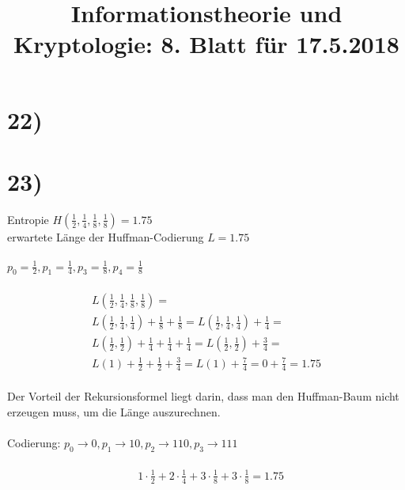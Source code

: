 %



  \title{Informationstheorie und Kryptologie: 8. Blatt für 17.5.2018}
  \maketitle

  \section*{22)}

  

  \section*{23)}

  Entropie $H(\frac{1}{2}, \frac{1}{4}, \frac{1}{8}, \frac{1}{8}) = 1.75$\\
  erwartete Länge der Huffman-Codierung $L = 1.75$\\
  \\
  $p_0 = \frac{1}{2}, p_1 = \frac{1}{4}, p_3 = \frac{1}{8}, p_4 = \frac{1}{8}$\\
  \\
  \begin{align*}
    & L(\frac{1}{2}, \frac{1}{4}, \frac{1}{8}, \frac{1}{8}) = &\\
    & L(\frac{1}{2}, \frac{1}{4}, \frac{1}{4}) + \frac{1}{8} + \frac{1}{8} = L(\frac{1}{2}, \frac{1}{4}, \frac{1}{4}) + \frac{1}{4} =\\
    & L(\frac{1}{2}, \frac{1}{2}) + \frac{1}{4} + \frac{1}{4} + \frac{1}{4} = L(\frac{1}{2}, \frac{1}{2}) + \frac{3}{4} =\\
    & L(1) + \frac{1}{2} + \frac{1}{2} + \frac{3}{4} = L(1) + \frac{7}{4} = 0 + \frac{7}{4} = 1.75
  \end{align*}
  \\
  Der Vorteil der Rekursionsformel liegt darin, dass man den Huffman-Baum nicht erzeugen muss, um die Länge auszurechnen.\\
  \\
  Codierung: $p_0 \rightarrow 0, p_1 \rightarrow 10, p_2 \rightarrow 110, p_3 \rightarrow 111$\\
  \\
  \begin{align*}
    & 1 \cdot \frac{1}{2} + 2 \cdot \frac{1}{4} + 3 \cdot \frac{1}{8} + 3 \cdot \frac{1}{8} = 1.75
  \end{align*}

